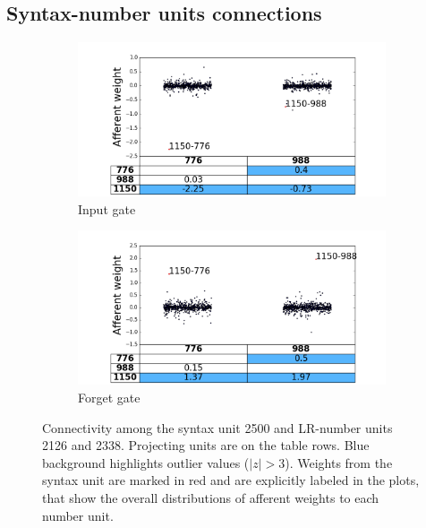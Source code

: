 \subsection{Syntax-number units connections}

\begin{figure}[t]
    \centering
    \begin{subfigure}{0.49\textwidth}
            \centering
            \includegraphics[width=\textwidth]{Figures/gate_Input_afferent_interactions.png}
            \caption{Input gate}
            \label{fig:interaction-input}
    \end{subfigure}
    \begin{subfigure}{0.49\textwidth}
           \centering
          \includegraphics[width=\textwidth]{Figures/gate_Forget_afferent_interactions.png}
          \caption{Forget gate}
          \label{fig:interaction-forget}
    \end{subfigure}
    \caption{Connectivity among the syntax unit \unit{2}{500} and
      LR-number units \unit{2}{126} and \unit{2}{338}. Projecting
      units are on the table rows. Blue background highlights outlier
      values ($|z|>3$). Weights from the syntax unit are marked in red
      and are explicitly labeled in the plots, that show the overall distributions of afferent weights to each number unit.}
\label{fig:interaction}
\end{figure}

